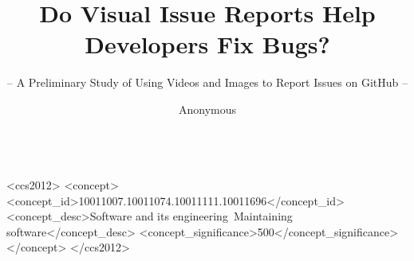 \documentclass[sigconf]{acmart}
\begin{document}
\title{Do Visual Issue Reports Help Developers Fix Bugs?}
\subtitle{-- A Preliminary Study of Using Videos and Images to Report Issues on GitHub --}


\newcommand{\RQone}{Do visual issue reports require less texts to report bugs than non-visual issue reports?}
\newcommand{\RQtwo}{Do visual issue reports lead to active discussions more than non-visual issue reports?}
\newcommand{\RQthree}{Do visual issue reports get resolved faster than non-visual issue reports?}

\def\summarybox#1{
\begin{tcolorbox}
    #1
\end{tcolorbox}
}


\begin{CCSXML}
<ccs2012>
<concept>
<concept_id>10011007.10011074.10011111.10011696</concept_id>
<concept_desc>Software and its engineering~Maintaining software</concept_desc>
<concept_significance>500</concept_significance>
</concept>
</ccs2012>
\end{CCSXML}




\author[]{Anonymous\\~}
\maketitle
\end{document}
